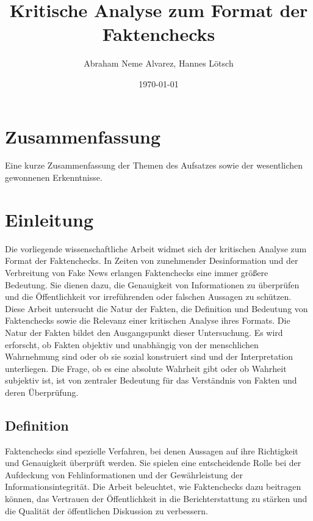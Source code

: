 \documentclass[a4paper,listof=totoc,bibliography=totoc]{scrartcl}
\title{Kritische Analyse zum Format der Faktenchecks}
\author{Abraham Neme Alvarez, Hannes Lötsch}
\date{\today}
\begin{document}
\maketitle

\section{Zusammenfassung}

Eine kurze Zusammenfassung der Themen des Aufsatzes sowie der wesentlichen
gewonnenen Erkenntnisse.

\section{Einleitung}

Die vorliegende wissenschaftliche Arbeit widmet sich der kritischen Analyse 
zum Format der Faktenchecks. In Zeiten von zunehmender Desinformation und der 
Verbreitung von Fake News erlangen Faktenchecks eine immer größere Bedeutung. 
Sie dienen dazu, die Genauigkeit von Informationen zu überprüfen und die 
Öffentlichkeit vor irreführenden oder falschen Aussagen zu schützen. Diese 
Arbeit untersucht die Natur der Fakten, die Definition und Bedeutung von 
Faktenchecks sowie die Relevanz einer kritischen Analyse ihres Formats.
Die Natur der Fakten bildet den Ausgangspunkt dieser Untersuchung. Es wird 
erforscht, ob Fakten objektiv und unabhängig von der menschlichen Wahrnehmung 
sind oder ob sie sozial konstruiert sind und der Interpretation unterliegen. 
Die Frage, ob es eine absolute Wahrheit gibt oder ob Wahrheit subjektiv ist, 
ist von zentraler Bedeutung für das Verständnis von Fakten und deren Überprüfung.

\subsection{Definition} 
Faktenchecks sind spezielle Verfahren, bei denen Aussagen auf ihre Richtigkeit 
und Genauigkeit überprüft werden. Sie spielen eine entscheidende Rolle bei der 
Aufdeckung von Fehlinformationen und der Gewährleistung der Informationsintegrität. 
Die Arbeit beleuchtet, wie Faktenchecks dazu beitragen können, das Vertrauen der 
Öffentlichkeit in die Berichterstattung zu stärken und die Qualität der öffentlichen 
Diskussion zu verbessern.
\end{document}
